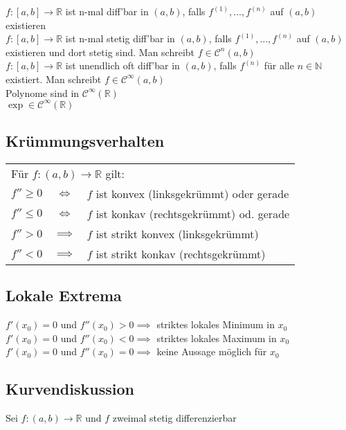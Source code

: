 \documentclass[a4paper,9pt]{extarticle}
\begin{document}
	$f : [a,b] → \mathbb{R}$ ist n-mal diff'bar in $(a,b)$, falls $f^{(1)}, \dots, f^{(n)}$ auf $(a,b)$ existieren \\
	
	$f : [a,b] → \mathbb{R}$ ist n-mal stetig diff'bar in $(a,b)$, falls $f^{(1)}, \dots, f^{(n)}$ auf $(a,b)$ existieren und dort stetig sind. Man schreibt $f \in \mathcal{C}^n(a,b)$ \\
	
	$f : [a,b] → \mathbb{R}$ ist unendlich oft diff'bar in $(a,b)$, falls $f^{(n)}$ für alle $n \in \mathbb{N}$ existiert. Man schreibt $f \in \mathcal{C}^∞(a,b)$ \\
	
	Polynome sind in $\mathcal{C}^∞(\mathbb{R})$ \\
	$\exp \in \mathcal{C}^∞(\mathbb{R})$ \\
	
	\subsection*{Krümmungsverhalten}
	\begin{tabular}{l @{ auf (a,b) } cl}
		\multicolumn{3}{l}{Für $f : (a,b) → \mathbb{R}$ gilt:} \\
		$f'' ≥ 0$ & $\iff$ & $f$ ist konvex (linksgekrümmt) oder gerade \\
		$f'' ≤ 0$ & $\iff$ & $f$ ist konkav (rechtsgekrümmt) od. gerade \\
		$f'' > 0$ & $\implies$ & $f$ ist strikt konvex (linksgekrümmt) \\
		$f'' < 0$ & $\implies$ & $f$ ist strikt konkav (rechtsgekrümmt) \\
	\end{tabular}
	
	\subsection*{Lokale Extrema}
	$f'(x_0) = 0$ und $f''(x_0) > 0 \implies$ striktes lokales Minimum in $x_0$ \\
	$f'(x_0) = 0$ und $f''(x_0) < 0 \implies$ striktes lokales Maximum in $x_0$ \\
	$f'(x_0) = 0$ und $f''(x_0) = 0 \implies$ keine Aussage möglich für $x_0$ \\
	
	\subsection*{Kurvendiskussion}
	Sei $f: (a,b) → \mathbb{R}$ und $f$ zweimal stetig differenzierbar
	
\end{document}
